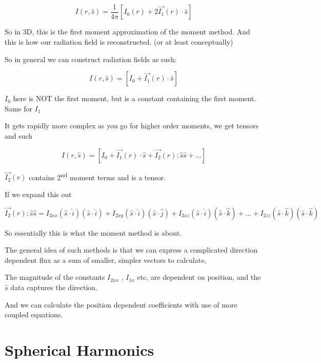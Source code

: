 \documentclass[12pt]{article}
\renewcommand{\_}{\kern-1.5pt\textunderscore\kern-1.5pt}
\begin{document}
\begin{itemize}
 \[ I \left( r,\hat{s} \right) =\frac{1}{4 \pi } \left[ I_{0} \left( r \right) +2\overrightarrow{I_{1}} \left( r \right)  \cdot \hat{s} \right]  \] \par

So in 3D, this is the first moment approximation of the moment method. And this is how our radiation field is reconstructed. (or at least conceptually)\par

So in general we can construct radiation fields as such:\par

 \[ I \left( r,\hat{s} \right) = \left[ I_{0}+\overrightarrow{I_{1}} \left( r \right)  \cdot \hat{s} \right]  \] \par

 \( I_{0} \)  here is NOT the first moment, but is a constant containing the first moment. Same for  \( I_{1} \) \par


\vspace{\baselineskip}
It gets rapidly more complex as you go for higher order moments, we get tensors and such\par

 \[ I \left( r,\hat{s} \right) = \left[ I_{0}+\overrightarrow{I_{1}} \left( r \right)  \cdot \hat{s}+\overrightarrow{I_{2}} \left( r \right) :\hat{s}\hat{s}+ \ldots  \right]  \] \par

 \( \overrightarrow{I_{2}} \left( r \right)  \) \textbf{ }contains 2\textsuperscript{nd} moment terms and is a tensor.\par

If we expand this out\par

 \[ \overrightarrow{I_{2}} \left( r \right) :\hat{s}\hat{s}=I_{2xx} \left( \hat{s} \cdot \hat{i} \right)  \left( \hat{s} \cdot \hat{i} \right) +I_{2xy} \left( \hat{s} \cdot \hat{i} \right)  \left( \hat{s} \cdot \hat{j} \right) +I_{2xz} \left( \hat{s} \cdot \hat{i} \right)  \left( \hat{s} \cdot \hat{k} \right) + \ldots +I_{2zz} \left( \hat{s} \cdot \hat{k} \right)  \left( \hat{s} \cdot \hat{k} \right)  \] \par

So essentially this is what the moment method is about.\par

The general idea of such methods is that we can express a complicated direction dependent flux as a sum of smaller, simpler vectors to calculate,\par

The magnitude of the constants  \( I_{2xx} \) ,  \( I_{1x} \)  etc, are dependent on position, and the  \( \hat{s} \)  data captures the direction.\par

And we can calculate the position dependent coefficients with use of more coupled equations.\par


\end{itemize}\section*{Spherical Harmonics}
\end{document}
